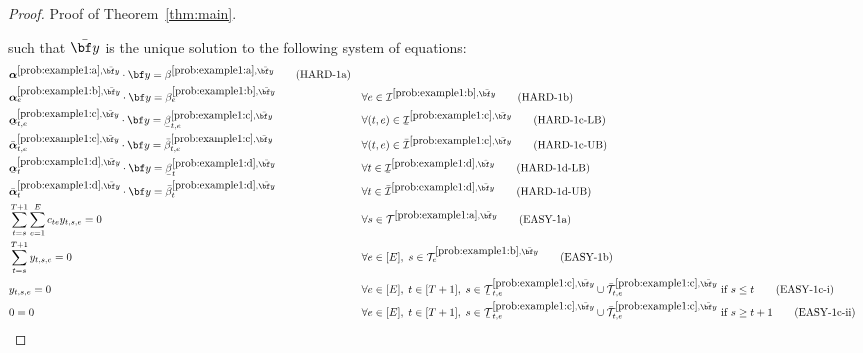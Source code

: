 \documentclass[nonblindrev,mnsc]{informs3} %
\newcommand{\by}{{\bf y}}
\newcommand{\balpha}{{\boldsymbol{\alpha}}}
\newcommand{\ubar}[1]{\text{\b{$#1$}}}
\begin{document}
\begin{APPENDICES}
\begin{proof}{Proof of Theorem~\ref{thm:main}. }
\begin{itemize}
  \end{itemize}
such that $\bar{\by}$ is the unique solution to  the following system of equations: 
\begin{align}
&\balpha^{\ref{prob:example1:a},\bar{\by}} \cdot \by = \beta^{\ref{prob:example1:a},\bar{\by}}  \tag{HARD-1a} \label{line:hard_1a} \\
 &\balpha^{\ref{prob:example1:b},\bar{\by}}_e \cdot \by = \beta^{\ref{prob:example1:b},\bar{\by}}_e && \forall e \in \mathcal{I}^{\ref{prob:example1:b},\bar{\by}}\tag{HARD-1b} \label{line:hard_1b}\\
&\ubar{\balpha}^{\ref{prob:example1:c},\bar{\by}}_{t,e} \cdot \by = \ubar{\beta}^{\ref{prob:example1:c},\bar{\by}}_{t,e} && \forall (t,e) \in  \ubar{\mathcal{I}}^{\ref{prob:example1:c},\bar{\by}}  \tag{HARD-1c-LB} \label{line:hard_1c_lb}\\
&\bar{\balpha}^{\ref{prob:example1:c},\bar{\by}}_{t,e} \cdot \by = \bar{\beta}^{\ref{prob:example1:c},\bar{\by}}_{t,e} && \forall (t,e) \in  \bar{\mathcal{I}}^{\ref{prob:example1:c},\bar{\by}}  \tag{HARD-1c-UB} \label{line:hard_1c_ub}\\
&\ubar{\balpha}^{\ref{prob:example1:d},\bar{\by}}_{t} \cdot \by = \ubar{\beta}^{\ref{prob:example1:d},\bar{\by}}_{t} && \forall t \in  \ubar{\mathcal{I}}^{\ref{prob:example1:d},\bar{\by}}  \tag{HARD-1d-LB} \label{line:hard_1d_lb}\\
&\bar{\balpha}^{\ref{prob:example1:d},\bar{\by}}_{t} \cdot \by = \bar{\beta}^{\ref{prob:example1:d},\bar{\by}}_{t} && \forall t \in  \bar{\mathcal{I}}^{\ref{prob:example1:d},\bar{\by}}  \tag{HARD-1d-UB} \label{line:hard_1d_ub}\\
&\sum_{t=s}^{T+1} \sum_{e=1}^E  c_{te} y_{t,s,e} = 0 && \forall s \in \mathcal{T}^{\ref{prob:example1:a},\bar{\by}}\tag{EASY-1a} \label{line:easy_1a}\\
& \sum_{t=s}^{T+1} y_{t,s,e} =0 && \forall e \in[E], \; s \in \mathcal{T}^{\ref{prob:example1:b},\bar{\by}}_e\tag{EASY-1b} \label{line:easy_1b}\\
&y_{t,s,e} =0 && \forall e \in[E], \; t \in[T+1], \; s \in  \ubar{\mathcal{T}}^{\ref{prob:example1:c},\bar{\by}}_{t,e}  \cup \bar{\mathcal{T}}^{\ref{prob:example1:c},\bar{\by}}_{t,e} \text{ if } s \le t \tag{EASY-1c-i} \label{line:easy_1c_i}\\
&0 =0 && \forall e \in[E], \; t \in[T+1], \; s \in  \ubar{\mathcal{T}}^{\ref{prob:example1:c},\bar{\by}}_{t,e}  \cup \bar{\mathcal{T}}^{\ref{prob:example1:c},\bar{\by}}_{t,e} \text{ if } s \ge t+1 \tag{EASY-1c-ii} \label{line:easy_1c_ii}\\

\end{align}
\end{proof}
\end{APPENDICES}
\end{document}
